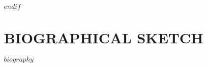 \documentclass{ufdissertation} %
\begin{document}
$endif$






\chapter{BIOGRAPHICAL SKETCH}
\label{biography}
\vspace*{-0.5\baselineskip}      %
$biography$
        
\setlength\parindent{1cm}
\end{document}
